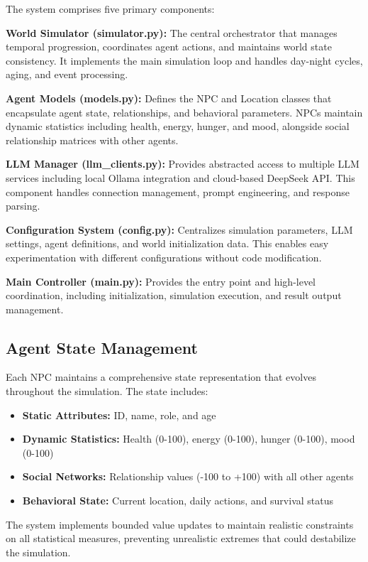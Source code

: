 \documentclass[conference]{IEEEtran}
\begin{document}
The system comprises five primary components:

\textbf{World Simulator (simulator.py):} The central orchestrator that manages temporal progression, coordinates agent actions, and maintains world state consistency. It implements the main simulation loop and handles day-night cycles, aging, and event processing.

\textbf{Agent Models (models.py):} Defines the NPC and Location classes that encapsulate agent state, relationships, and behavioral parameters. NPCs maintain dynamic statistics including health, energy, hunger, and mood, alongside social relationship matrices with other agents.

\textbf{LLM Manager (llm\_clients.py):} Provides abstracted access to multiple LLM services including local Ollama integration and cloud-based DeepSeek API. This component handles connection management, prompt engineering, and response parsing.

\textbf{Configuration System (config.py):} Centralizes simulation parameters, LLM settings, agent definitions, and world initialization data. This enables easy experimentation with different configurations without code modification.

\textbf{Main Controller (main.py):} Provides the entry point and high-level coordination, including initialization, simulation execution, and result output management.

\subsection{Agent State Management}

Each NPC maintains a comprehensive state representation that evolves throughout the simulation. The state includes:

\begin{itemize}
\item \textbf{Static Attributes:} ID, name, role, and age
\item \textbf{Dynamic Statistics:} Health (0-100), energy (0-100), hunger (0-100), mood (0-100)
\item \textbf{Social Networks:} Relationship values (-100 to +100) with all other agents
\item \textbf{Behavioral State:} Current location, daily actions, and survival status
\end{itemize}

The system implements bounded value updates to maintain realistic constraints on all statistical measures, preventing unrealistic extremes that could destabilize the simulation.
\end{document}
